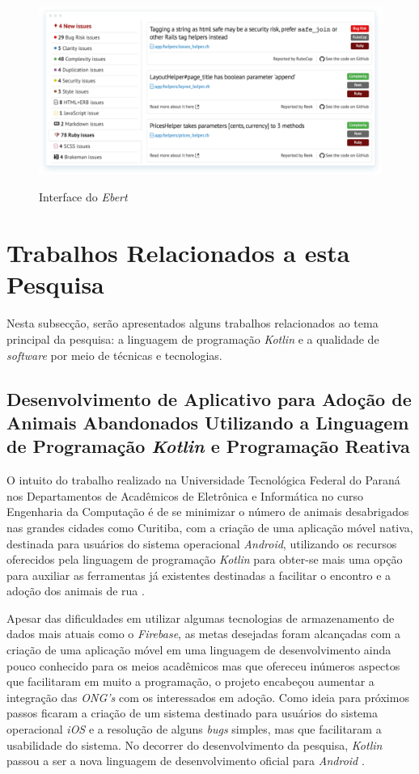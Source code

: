  \FloatBarrier
\begin{figure}[!htbp]
	\centering
		\caption{Interface do \textit{Ebert}} 
	\includegraphics[scale=0.4]{imagens/Ebert}
	\label{fig:figura7}
\end{figure}
\FloatBarrier

\section{Trabalhos Relacionados a esta Pesquisa}

Nesta subsecção, serão apresentados alguns trabalhos relacionados ao tema principal da pesquisa: a linguagem de programação \textit{Kotlin} e a qualidade de \textit{software} por meio de técnicas e tecnologias.

\subsection{Desenvolvimento de Aplicativo para Adoção de Animais Abandonados Utilizando a Linguagem de Programação \textit{Kotlin} e Programação Reativa \cite{TccKotlin}}

O intuito do trabalho realizado na Universidade Tecnológica Federal do Paraná nos Departamentos de Acadêmicos de Eletrônica e Informática no curso Engenharia da Computação é de se minimizar o número de animais desabrigados nas grandes cidades como Curitiba, com a criação de uma aplicação móvel nativa, destinada para usuários do sistema operacional \textit{Android}, utilizando os recursos oferecidos pela linguagem de programação \textit{Kotlin} para obter-se mais uma opção para auxiliar as ferramentas já existentes destinadas a facilitar o encontro e a adoção dos animais de rua \cite{TccKotlin}.

Apesar das dificuldades em utilizar algumas tecnologias de armazenamento de dados mais atuais como o \textit{Firebase}, as metas desejadas foram alcançadas com a criação de uma aplicação móvel em uma linguagem de desenvolvimento ainda pouco conhecido para os meios acadêmicos mas que ofereceu inúmeros aspectos que facilitaram em muito a programação, o projeto encabeçou aumentar a integração das \textit{ONG's} com os interessados em adoção. Como ideia para próximos passos ficaram a criação de um sistema destinado para usuários do sistema operacional \textit{iOS} e a resolução de alguns \textit{bugs} simples, mas que facilitaram a usabilidade do sistema. No decorrer do desenvolvimento da pesquisa, \textit{Kotlin} passou a ser a nova linguagem de desenvolvimento oficial para \textit{Android} \cite{TccKotlin}. 

